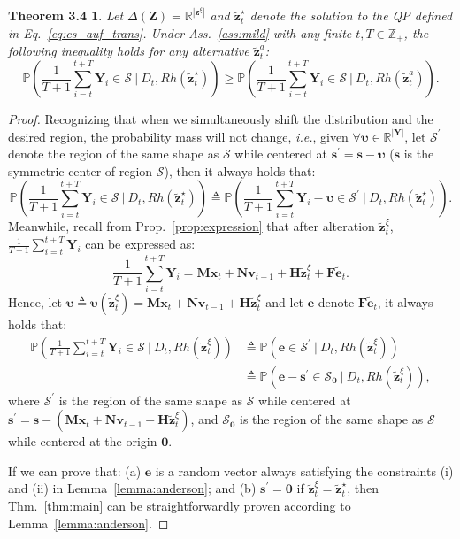 \documentclass{article}
\theoremstyle{plain}
\newtheorem*{theorem34}{Theorem 3.4}
\theoremstyle{definition}
\theoremstyle{remark}
\def \ie {\textit{i.e.}}
\def \Eq {Eq.}
\def \prop {Prop.}
\def \x {\mathbf{x}}
\def \Z {\mathbf{Z}}
\def \N {\mathbf{N}}
\def \sS {\mathcal{S}}
\def \Y {\mathbf{Y}}
\def \s {\mathbf{s}}
\def \M {\mathbf{M}}
\def \H {\mathbf{H}}
\def \F {\mathbf{F}}
\def \e {\mathbf{e}}
\def \v {\mathbf{v}}
\def \z {\mathbf{z}}
\begin{document}
\begin{theorem34}
  Let \(\Delta(\Z) = \mathbb{R}^{|\z^\xi|}\) and \(\tilde{\z}_t^\star\) denote the solution to the QP defined in \Eq~\eqref{eq:cs_auf_trans}.  
  Under Ass.~\ref{ass:mild} with any finite \(t, T\in \mathbb{Z}_+\), the following inequality holds for any alternative \(\tilde{\z}^a_t\):
  \[
    \mathbb{P}\left(\frac{1}{T+1}\sum_{i=t}^{t+T}\Y_{i} \in\sS\ \Big| \ D_t, Rh(\tilde{\z}_t^\star)\right) 
    \geq \mathbb{P}\left(\frac{1}{T+1}\sum_{i=t}^{t+T}\Y_{i} \in\sS\ \Big| \ D_t, Rh(\tilde{\z}^a_t)\right).
  \]
\end{theorem34}


\begin{proof}
  Recognizing that when we simultaneously shift the distribution and the desired region, the probability mass will not change, \ie, given \(\forall \bm{\upsilon}\in\mathbb{R}^{|\Y|} \), let \(\sS^\prime\) denote the region of the same shape as \(\sS\) while centered at \(\s^\prime = \s-\bm{\upsilon}\) (\(\s\) is the symmetric center of region \(\sS\)), then it always holds that:
  \[
    \mathbb{P}\left(\frac{1}{T+1}\sum_{i=t}^{t+T}\Y_{i}\in\sS\ \Big| \ D_t, Rh(\tilde{\z}_t^\star)\right) \triangleq \mathbb{P}\left(\frac{1}{T+1}\sum_{i=t}^{t+T}\Y_{i} - \bm{\upsilon} \in\sS^\prime\ \Big| \ D_t, Rh(\tilde{\z}_t^\star)\right).
  \]
  Meanwhile, recall from \prop~\ref{prop:expression} that after alteration \(\tilde{\z}_t^\xi\), \(\frac{1}{T+1}\sum_{i=t}^{t+T}\Y_{i}\) can be expressed as:
  \[
    \frac{1}{T+1}\sum_{i=t}^{t+T}\Y_{i} = \M\x_t + \N\v_{t-1} + \H\tilde{\z}_t^\xi + \F\tilde{\e}_t.
  \]
  Hence, let \(\bm{\upsilon}\triangleq \bm{\upsilon}(\tilde{\z}_t^\xi) = \M\x_t + \N\v_{t-1} + \H\tilde{\z}_t^\xi\) and let \(\e\) denote \(\F\tilde{\e}_t\), it always holds that:
  \[
  \begin{aligned}
    \mathbb{P}\left(\frac{1}{T+1}\sum_{i=t}^{t+T}\Y_{i}\in\sS\ \Big| \ D_t, Rh(\tilde{\z}_t^\xi)\right) &\triangleq \mathbb{P}\left(\e \in\sS^\prime\ \Big| \ D_t, Rh(\tilde{\z}_t^\xi) \right)\\
    &\triangleq \mathbb{P}\left(\e - \s^\prime \in\sS_{\bm{0}}\ \Big| \ D_t, Rh(\tilde{\z}_t^\xi) \right),
  \end{aligned}
  \]
  where \(\sS^\prime\) is the region of the same shape as \(\sS\) while centered at \(\s^\prime = \s-( \M\x_t + \N\v_{t-1} + \H\tilde{\z}_t^\xi)\), and \(\sS_{\bm{0}}\) is the region of the same shape as \(\sS\) while centered at the origin \({\bm{0}}\).


  If we can prove that: (a) \(\e\) is a random vector always satisfying the constraints (i) and (ii) in Lemma~\ref{lemma:anderson}; and (b) \(\s^\prime = \bm{0}\) if \(\tilde{\z}_t^\xi=\tilde{\z}_t^\star\), then Thm.~\ref{thm:main} can be straightforwardly proven according to Lemma~\ref{lemma:anderson}.


\end{proof}
\end{document}

